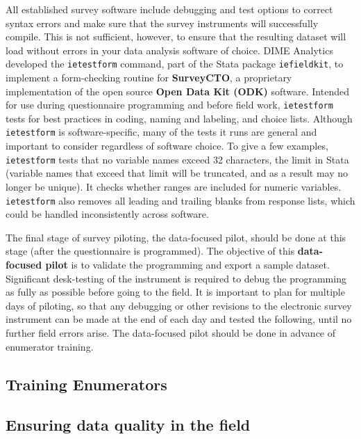 All established survey software include debugging and test options
to correct syntax errors and make sure that
the survey instruments will successfully compile.
This is not sufficient, however, to ensure that the resulting dataset
will load without errors in your data analysis software of choice.
DIME Analytics developed the \texttt{ietestform} command,
part of the Stata package \texttt{iefieldkit},
to implement a form-checking routine for \textbf{SurveyCTO},
a proprietary implementation of the open source \textbf{Open Data Kit (ODK)} software.
Intended for use during questionnaire programming and before field work,
\texttt{ietestform} tests for best practices
in coding, naming and labeling, and choice lists.
Although \texttt{ietestform} is software-specific,
many of the tests it runs are general and important to consider regardless of software choice.
To give a few examples, \texttt{ietestform} tests that no variable names exceed
32 characters, the limit in Stata (variable names that exceed that limit will
be truncated, and as a result may no longer be unique).
It checks whether ranges are included for numeric variables.
\texttt{ietestform} also removes all leading and trailing blanks from response lists,
which could be handled inconsistently across software.

The final stage of survey piloting, the data-focused pilot, should be done at this stage (after the questionnaire is programmed).
The objective of this \textbf{data-focused pilot}
is to validate the programming and export a sample dataset.
Significant desk-testing of the instrument is required to debug the programming
as fully as possible before going to the field.
It is important to plan for multiple days of piloting,
so that any debugging or other revisions to the electronic survey instrument
can be made at the end of each day and tested the following, until no further field errors arise.
The data-focused pilot should be done in advance of enumerator training.

\subsection{Training Enumerators}


\subsection{Ensuring data quality in the field}

